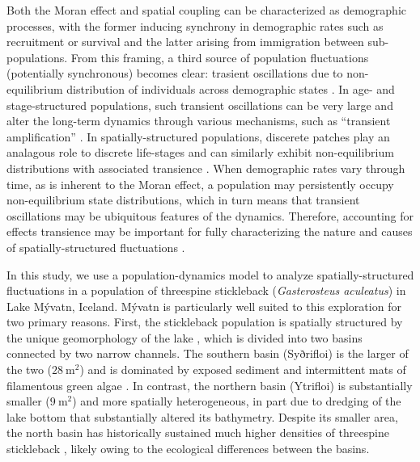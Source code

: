 Both the Moran effect and spatial coupling can be characterized as demographic processes,
with the former inducing synchrony in demographic rates such as recruitment or survival
and the latter arising from immigration between sub-populations.
From this framing,
a third source of population fluctuations (potentially synchronous) becomes clear:
trasient oscillations due to non-equilibrium distribution of individuals across
demographic states
\citep{caswell2001matrix, koons2017understanding}.
In age- and stage-structured populations, 
such transient oscillations can be very large and alter the long-term dynamics 
through various mechanisms,
such as ``transient amplification''
\citep{neubert1997, tenhumberg2009}. 
In spatially-structured populations, 
discerete patches play an analagous role to discrete life-stages 
and can similarly exhibit non-equilibrium distributions with associated transience
\citep{ozgul2009}.
When demographic rates vary through time,
as is inherent to the Moran effect,
a population may persistently occupy non-equilibrium state distributions,
which in turn means that transient oscillations may be ubiquitous features of the dynamics.
Therefore, accounting for effects transience may be important for 
fully characterizing the nature and causes of spatially-structured fluctuations
\citep{hastings2010}.

In this study, 
we use a population-dynamics model to analyze spatially-structured fluctuations 
in a population of threespine stickleback (\emph{Gasterosteus aculeatus})
in Lake M\'{y}vatn, Iceland.
M\'{y}vatn is particularly well suited to this exploration for two primary reasons.
First, the stickleback population is spatially structured by the unique geomorphology
of the lake \citep{gislason1998, millet2013}, 
which is divided into two basins connected by two narrow channels.
The southern basin (Syðrifloi) is the larger of the two ($28~\text{m}^2$) and is dominated
by exposed sediment and intermittent mats of filamentous green algae
\citep{einarsson2004myvatn}.
In contrast, the northern basin (Ytrifloi) is substantially smaller ($9~\text{m}^2$)
and more spatially heterogeneous, 
in part due to dredging of the lake bottom that substantially altered its bathymetry.
Despite its smaller area, the north basin has historically sustained much higher
densities of threespine stickleback  \citep{gislason1998}, 
likely owing to the ecological differences between the basins. 


